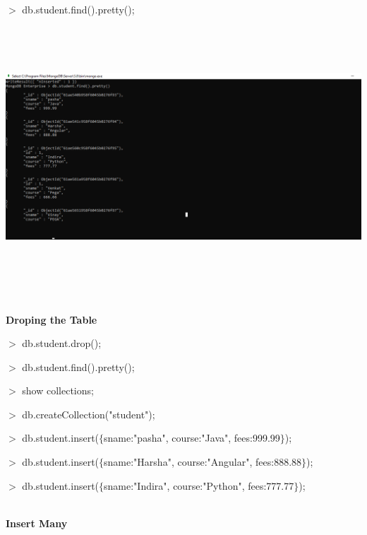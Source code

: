 \documentclass{article}
\begin{document}
\noindent  $\mathrm{>}$ db.student.find().pretty();

\noindent 

\begin{center}
	\noindent \includegraphics*[width=6.68in, height=3.82in]{IMG-04-06}
\end{center}

\noindent 

\noindent 

\noindent 

\noindent 

\noindent 

\noindent \\ \textbf{Droping the Table}

\noindent  $\mathrm{>}$ db.student.drop();

\noindent $\mathrm{>}$ db.student.find().pretty();

\noindent $\mathrm{>}$ show collections;

\noindent 

\noindent $\mathrm{>}$ db.createCollection("student");

\noindent $\mathrm{>}$ db.student.insert($\mathrm{\{}$sname:"pasha", course:"Java", fees:999.99$\mathrm{\}}$);   

\noindent $\mathrm{>}$ db.student.insert($\mathrm{\{}$sname:"Harsha", course:"Angular", fees:888.88$\mathrm{\}}$);

\noindent $\mathrm{>}$ db.student.insert($\mathrm{\{}$sname:"Indira", course:"Python", fees:777.77$\mathrm{\}}$);

\noindent 

\noindent \\ \textbf{Insert Many}
\end{document}
